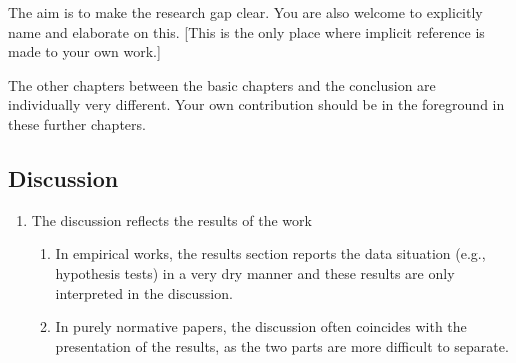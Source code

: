 The aim is to make the research gap clear. You are also welcome to explicitly name and elaborate on this. [This is the only place where implicit reference is made to your own work.]

The other chapters between the basic chapters and the conclusion are individually very different. Your own contribution should be in the foreground in these further chapters.


\subsection{Discussion}
\begin{enumerate}
    \item The discussion reflects the results of the work
    \begin{enumerate}
        \item In empirical works, the results section reports the data situation (e.g., hypothesis tests) in a very dry manner and these results are only interpreted in the discussion.
        \item In purely normative papers, the discussion often coincides with the presentation of the results, as the two parts are more difficult to separate.
    \end{enumerate}
\end{enumerate}


